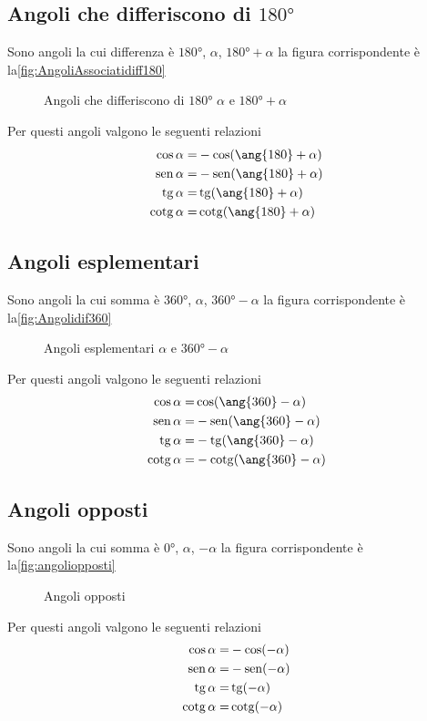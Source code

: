 \subsection{Angoli che differiscono di $\ang{180}$}
Sono angoli la cui differenza è $\ang{180}$, $\alpha$, $\ang{180}+\alpha$ la figura corrispondente è la\nobs\vref{fig:AngoliAssociatidiff180}
\begin{figure}[H]
	\centering
	
			\caption{Angoli che differiscono di $\ang{180}$ $\alpha$ e $\ang{180}+\alpha$}
			\label{fig:AngoliAssociatidiff180}
\end{figure}
Per questi angoli valgono le seguenti relazioni
\begin{align}
\cos\alpha=&{}-\cos(\ang{180}+\alpha)\\
\sen\alpha=&{}-\sen(\ang{180}+\alpha)\\
\tg\alpha=&{}\tg(\ang{180}+\alpha)\\
\cotg\alpha=&{}\cotg(\ang{180}+\alpha)
\end{align}
\subsection{Angoli esplementari}
Sono angoli la cui somma è $\ang{360}$, $\alpha$, $\ang{360}-\alpha$ la figura corrispondente è la\nobs\vref{fig:Angolidif360}
\begin{figure}[H]
		\centering
			
			\caption{Angoli esplementari $\alpha$ e $\ang{360}-\alpha$}
			\label{fig:Angolidif360}
	\end{figure}
Per questi angoli valgono le seguenti relazioni
\begin{align}
\cos\alpha=&{}\cos(\ang{360}-\alpha)\\
\sen\alpha=&{}-\sen(\ang{360}-\alpha)\\
\tg\alpha=&{}-\tg(\ang{360}-\alpha)\\
\cotg\alpha=&{}-\cotg(\ang{360}-\alpha)
\end{align}
\subsection{Angoli opposti}
Sono angoli la cui somma è $\ang{0}$, $\alpha$, $-\alpha$ la figura corrispondente è la\nobs\vref{fig:angoliopposti}
\begin{figure}[H]
	\centering
	
	\caption{Angoli opposti}
	\label{fig:angoliopposti}
\end{figure}
Per questi angoli valgono le seguenti relazioni
\begin{align}
\cos\alpha=&{}-\cos(-\alpha)\\
\operatorname{sen}\alpha=&{}-\operatorname{sen}(-\alpha)\\
\operatorname{tg}\alpha=&{}\operatorname{tg}(-\alpha)\\
\operatorname{cotg}\alpha=&{}\operatorname{cotg}(-\alpha)\\
\end{align}
